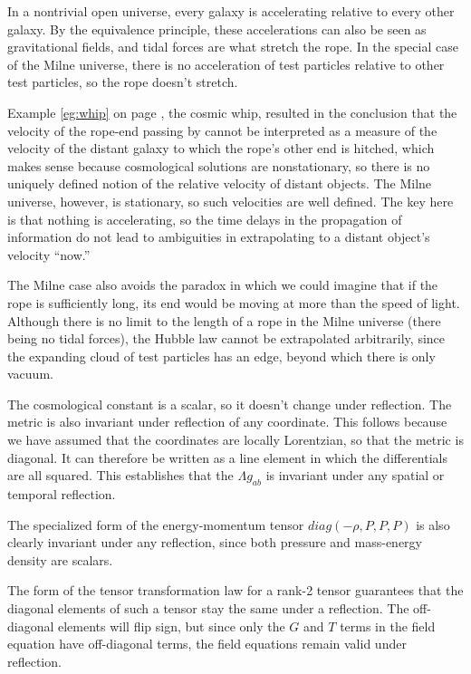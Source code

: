 In a nontrivial open universe, every galaxy is accelerating relative to every other galaxy. By the equivalence
principle, these accelerations can also be seen as gravitational fields, and tidal forces are what
stretch the rope. In the special case of the Milne universe, there is no acceleration of test particles
relative to other test particles, so the rope doesn't stretch.

Example \ref{eg:whip} on page \pageref{eg:whip}, the cosmic whip, resulted in the conclusion that the
velocity of the rope-end passing by cannot be interpreted as a measure of the velocity of the distant
galaxy to which the rope's other end is hitched, which makes sense because cosmological solutions are
nonstationary, so there is no uniquely defined notion of the relative velocity of distant objects.
The Milne universe, however, is stationary, so such velocities are well defined. The key here is that
nothing is accelerating, so the time delays in the propagation of information do not lead to ambiguities
in extrapolating to a distant object's velocity ``now.''

The Milne case also avoids the paradox in which we could imagine that if the rope is sufficiently long,
its end would be moving at more than the speed of light. Although there is no limit to the length of
a rope in the Milne universe (there being no tidal forces), the Hubble law cannot be extrapolated arbitrarily,
since the expanding cloud of test particles has an edge, beyond which there is only vacuum.

The cosmological constant is a scalar, so it doesn't change under reflection. The metric is also invariant
under reflection of any coordinate. This follows because we have assumed that the coordinates are locally Lorentzian,
so that the metric is diagonal. It can therefore be written as a line element in which the differentials are all
squared. This establishes that the $\Lambda g_{ab}$ is invariant under any spatial or temporal reflection.

The specialized form of the energy-momentum tensor $diag(-\rho,P,P,P)$ is also clearly invariant under
any reflection, since both pressure and mass-energy density are scalars.

The form of the tensor transformation law for a rank-2 tensor guarantees that the diagonal elements of such
a tensor stay the same under a reflection. The off-diagonal elements will flip sign, but since only the
$G$ and $T$ terms in the field equation have off-diagonal terms, the field equations remain valid under
reflection.

